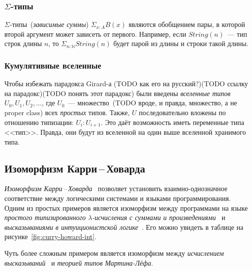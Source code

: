 \subsubsection{$\Sigma$-типы}

$\Sigma$-типы~(\emph{зависимые суммы}) $\Sigma_{x:A} B(x)$ являются
обобщением пары, в которой второй аргумент может зависеть от первого.
Например, если $String(n)$~--- тип строк длины $n$, то
$\Sigma_{n:\mathbb{N}} String(n)$ будет парой из длины и строки такой
длины.

\subsubsection{Кумулятивные вселенные}

Чтобы избежать парадокса Girard-а (TODO как его на русский?)(TODO
ссылку на парадокс)(TODO понять этот парадокс) были введены
\emph{вселенные типов} $U_0, U_1, U_2, \ldots$, где $U_0$~---
множество~(TODO вроде, и правда, множество, а не proper class) всех
\emph{простых} типов. Также, $U$ последовательно вложены по отношению
типизации: $U_i : U_{i+1}$. Это даёт возможность иметь переменные типа
<<тип>>. Правда, они будут из вселенной на один выше вселенной
хранимого типа.

\subsection{Изоморфизм Карри\,–\,Ховарда}

\emph{Изоморфизм Карри\,--\,Ховарда}~\cite{curryhoward} позволяет
установить взаимно-однозначное соответствие между логическими
системами и языками программирования. Одним из простых примеров
является изоморфизм между программами на языке \emph{простого
  типизированного $\lambda$-исчисления с суммами и
  произведениями}~\cite{curryhoward} и \emph{высказываниями в
  интуиционистской логике}~\cite{curryhoward}. Его можно увидеть в
таблице на рисунке~\ref{fig:curry-howard-int}. 

Чуть более сложным примером является изоморфизм между
\emph{исчислением высказываний}~\cite{шень2,curryhoward} и
\emph{теорией типов Мартина-Лёфа}.

